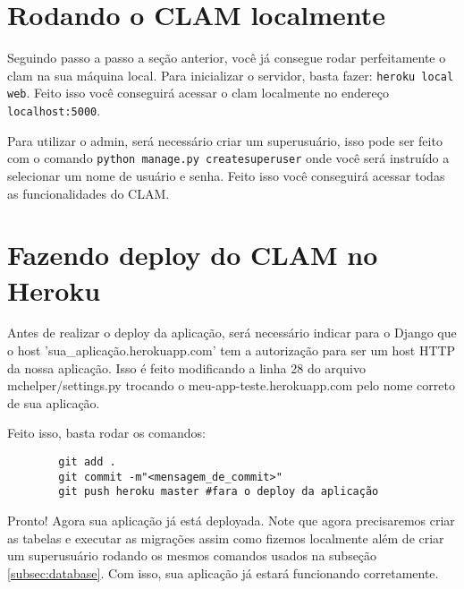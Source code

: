 \section{Rodando o CLAM localmente}

Seguindo passo a passo a seção anterior, você já consegue rodar perfeitamente o clam na sua máquina
local. Para inicializar o servidor, basta fazer: \texttt{heroku local web}. Feito isso você conseguirá
acessar o clam localmente no endereço \texttt{localhost:5000}.

Para utilizar o admin, será necessário criar um superusuário, isso pode ser feito com o comando
\texttt{python manage.py createsuperuser} onde você será instruído a selecionar um nome de usuário e 
senha. Feito isso você conseguirá acessar todas as funcionalidades do CLAM.

\section{Fazendo deploy do CLAM no Heroku}

Antes de realizar o deploy da aplicação, será necessário indicar para o Django que o host
'sua_aplicação.herokuapp.com' tem a autorização para ser um host HTTP da nossa aplicação.
Isso é feito modificando a linha 28 do arquivo mchelper/settings.py trocando o 
meu-app-teste.herokuapp.com pelo nome correto de sua aplicação.

Feito isso, basta rodar os comandos:

\begin{center}
	\begin{verbatim}
		git add .
		git commit -m"<mensagem_de_commit>"
		git push heroku master #fara o deploy da aplicação
	\end{verbatim}
\end{center}

Pronto! Agora sua aplicação já está deployada. Note que agora precisaremos criar as tabelas
e executar as migrações assim como fizemos localmente além de criar um superusuário rodando
os mesmos comandos usados na subseção \ref{subsec:database}. Com isso, sua aplicação já estará
funcionando corretamente. 